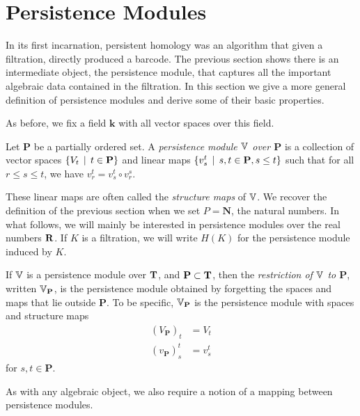 \section{Persistence Modules}
\label{section-modules}

In its first incarnation, persistent homology was an algorithm that given a filtration, directly produced a barcode. The previous section shows there is an intermediate object, the persistence module, that captures all the important algebraic data contained in the filtration. In this section we give a more general definition of persistence modules and derive some of their basic properties.

As before, we fix a field $\mathbf{k}$ with all vector spaces over this field.

\begin{definition}
Let $\mathbf{P}$ be a partially ordered set. A \emph{persistence module $\mathbb{V}$ over $\mathbf{P}$} is a collection of vector spaces $\{V_t \, \mid \, t \in \mathbf{P}\}$ and linear maps $\{v_s^t \, \mid \, s, t \in \mathbf{P}, s \leq t\}$ such that for all $r \leq s \leq t$, we have $v_r^t = v_s^t \circ v_r^s$. 
\end{definition}

These linear maps are often called the \emph{structure maps} of $\mathbb{V}$. We recover the definition of the previous section when we set $P = \mathbf{N}$, the natural numbers. In what follows, we will mainly be interested in persistence modules over the real numbers $\mathbf{R}$. If $K$ is a filtration, we will write $H(K)$ for the persistence module induced by $K$.

\begin{definition}
If $\mathbb{V}$ is a persistence module over $\mathbf{T}$, and $\mathbf{P} \subset \mathbf{T}$, then the \emph{restriction of $\mathbb{V}$ to $\mathbf{P}$}, written $\mathbb{V}_{\mathbf{P}}$, is the persistence module obtained by forgetting the spaces and maps that lie outside $\mathbf{P}$. To be specific, $\mathbb{V}_{\mathbf{P}}$ is the persistence module with spaces and structure maps
\begin{align*}
(V_{\mathbf{P}})_t & = V_t \\
(v_{\mathbf{P}})_s^t &= v_s^t
\end{align*}
for $s, t \in \mathbf{P}$.
\end{definition}

As with any algebraic object, we also require a notion of a mapping between persistence modules. 

